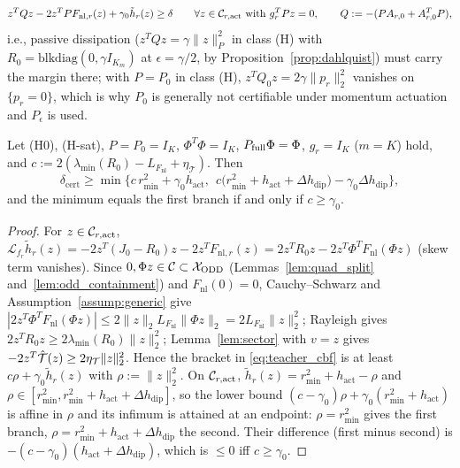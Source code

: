 \begin{equation}
\label{eq:null_space_cond}
z^TQz - 2z^TPF_{\mathrm{nl},r}(z) + \gamma_0\tilde{h}_r(z) \ge \delta \qquad \forall z \in \mathcal{C}_{r,\mathrm{act}} \text{ with } g_r^TPz = 0, \qquad Q := -(PA_{r,0} + A_{r,0}^TP),
\end{equation}
i.e., passive dissipation (\(z^TQz = \gamma\|z\|_P^2\) in class (H) with \(R_0 = \mathrm{blkdiag}(0,\gamma I_{K_m})\) at \(\epsilon = \gamma/2\), by Proposition~\ref{prop:dahlquist}) must carry the margin there; with \(P = P_0\) in class (H), \(z^TQ_0z = 2\gamma\|p_r\|_2^2\) vanishes on \(\{p_r = 0\}\), which is why \(P_0\) is generally not certifiable under momentum actuation and \(P_\epsilon\) is used.

\begin{lemma}
\label{lem:delta_cert_closed}
Let (H0), (H-sat), \(P = P_0 = I_K\), \(\Phi^T\Phi = I_K\), \(P_{\mathrm{full}}\Phi = \Phi\), \(g_r = I_K\) (\(m = K\)) hold, and \(c := 2(\lambda_{\min}(R_0) - L_{F_{\mathrm{nl}}} + \eta_{\mathcal{T}})\). Then
\begin{equation}
\label{eq:delta_cert_closed}
\delta_{\mathrm{cert}} \ge \min\Big\{c\,r_{\min}^2 + \gamma_0h_{\mathrm{act}},\ \ c\big(r_{\min}^2 + h_{\mathrm{act}} + \Delta h_{\mathrm{dip}}\big) - \gamma_0\Delta h_{\mathrm{dip}}\Big\},
\end{equation}
and the minimum equals the first branch if and only if \(c \ge \gamma_0\).
\end{lemma}
\begin{proof}
For \(z \in \mathcal{C}_{r,\mathrm{act}}\), \(\mathcal{L}_{f_r}\tilde h_r(z) = -2z^T(J_0 - R_0)z - 2z^TF_{\mathrm{nl},r}(z) = 2z^TR_0z - 2z^T\Phi^TF_{\mathrm{nl}}(\Phi z)\) (skew term vanishes). Since \(0, \Phi z \in \mathcal{C} \subset \mathcal{X}_{\mathrm{ODD}}\) (Lemmas~\ref{lem:quad_split} and~\ref{lem:odd_containment}) and \(F_{\mathrm{nl}}(0) = 0\), Cauchy--Schwarz and Assumption~\ref{assump:generic} give \(|2z^T\Phi^TF_{\mathrm{nl}}(\Phi z)| \le 2\|z\|_2L_{F_{\mathrm{nl}}}\|\Phi z\|_2 = 2L_{F_{\mathrm{nl}}}\|z\|_2^2\); Rayleigh gives \(2z^TR_0z \ge 2\lambda_{\min}(R_0)\|z\|_2^2\); Lemma~\ref{lem:sector} with \(v = z\) gives \(-2z^T\hat{\mathcal{T}}(z) \ge 2\eta_{\mathcal{T}}\|z\|_2^2\). Hence the bracket in \eqref{eq:teacher_cbf} is at least \(c\rho + \gamma_0\tilde h_r(z)\) with \(\rho := \|z\|_2^2\). On \(\mathcal{C}_{r,\mathrm{act}}\), \(\tilde h_r(z) = r_{\min}^2 + h_{\mathrm{act}} - \rho\) and \(\rho \in [r_{\min}^2, r_{\min}^2 + h_{\mathrm{act}} + \Delta h_{\mathrm{dip}}]\), so the lower bound \((c - \gamma_0)\rho + \gamma_0(r_{\min}^2 + h_{\mathrm{act}})\) is affine in \(\rho\) and its infimum is attained at an endpoint: \(\rho = r_{\min}^2\) gives the first branch, \(\rho = r_{\min}^2 + h_{\mathrm{act}} + \Delta h_{\mathrm{dip}}\) the second. Their difference (first minus second) is \(-(c - \gamma_0)(h_{\mathrm{act}} + \Delta h_{\mathrm{dip}})\), which is \(\le 0\) iff \(c \ge \gamma_0\).
\end{proof}

